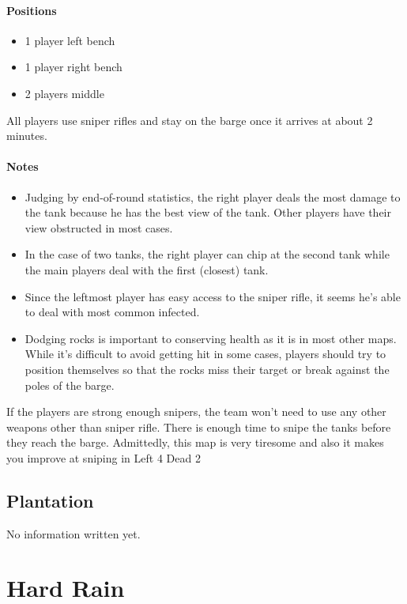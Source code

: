 \paragraph{Positions}
\begin{itemize}
\item 1 player left bench
\item 1 player right bench
\item 2 players middle 
\end{itemize}

All players use sniper rifles and stay on the barge once it arrives at about 2 minutes.

\paragraph{Notes}
\begin{itemize}
\item Judging by end-of-round statistics, the right player deals the most damage to the tank because he has the best view of the tank. Other players have their view obstructed in most cases.
\item In the case of two tanks, the right player can chip at the second tank while the main players deal with the first (closest) tank.
\item Since the leftmost player has easy access to the sniper rifle, it seems he's able to deal with most common infected.
\item Dodging rocks is important to conserving health as it is in most other maps. While it's difficult to avoid getting hit in some cases, players should try to position themselves so that the rocks miss their target or break against the poles of the barge.
\end{itemize}

If the players are strong enough snipers, the team won't need to use any other weapons other than sniper rifle. There is enough time to snipe the tanks before they reach the barge. Admittedly, this map is very tiresome and also it makes you improve at sniping in Left 4 Dead 2

\subsection{Plantation}
No information written yet.

\section{Hard Rain}

